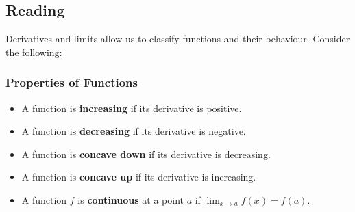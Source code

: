 


\subsection*{Reading}
Derivatives and limits allow us to classify functions and their behaviour. Consider the following:

\subsubsection*{Properties of Functions}
\begin{itemize}
  \item A function is \textbf{increasing} if its derivative is positive.
  \item A function is \textbf{decreasing} if its derivative is negative.
  \item A function is \textbf{concave down} if its derivative is decreasing.
  \item A function is \textbf{concave up} if its derivative is increasing.
  \item A function $ f $ is \textbf{continuous} at a point $ a $ if $ \lim_{x \to a} f(x) = f(a) $.
\end{itemize}

